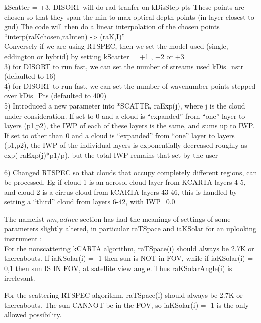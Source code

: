 \documentclass[12pt]{article}
\begin{document}
{{{{       kScatter  = +3, DISORT will do rad tranfer on kDisStep pts 
                       These points are chosen so that they span the min
                       to max optical depth points (in layer closest to gnd)
                   The code will then do a linear interpolation of the
                   chosen points ``interp(raKchosen,raInten) -> (raK,I)''\\

     Conversely if we are using RTSPEC, then we set the model used (single, 
       eddington or hybrid) by setting kScatter  = +1 , +2 or +3 \\

  3) for DISORT to run fast, we can set the number of streams used
       kDis\_nstr  (defaulted to 16)\\

  4) for DISORT to run fast, we can set the number of wavenumber points 
     stepped over kDis\_Pts (defaulted to 400)\\

  5) Introduced a new parameter into *SCATTR, raExp(j), where j is
     the cloud under consideration. If set to 0 and a cloud is 
     ``expanded'' from ``one'' layer to layers (p1,p2), the IWP of each of 
     these layers is the same, and sums up to IWP. 
     If set to other than 0 and a cloud is ``expanded'' from ``one'' layer 
     to layers (p1,p2), the IWP of the individual layers is exponentially 
     decreased roughly as exp(-raExp(j)*p1/p), but the total IWP remains that
     set by the user

   6) Changed RTSPEC so that clouds that occupy completely 
      different regions, can be processed. Eg if cloud 1 is an
      aerosol cloud layer from KCARTA layers 4-5, and cloud 2 is a 
      cirrus cloud from kCARTA layers 43-46, this is handled by 
      setting a ``third'' cloud from layers 6-42, with IWP=0.0

The namelist $nm_radnce$ section has had the meanings of settings of some
parameters slightly altered, in particular raTSpace and iaKSolar for an
uplooking instrument : \\
For the nonscattering kCARTA algorithm, raTSpace(i) should always be 2.7K or 
thereabouts. If iaKSolar(i) = -1 then sun is NOT in FOV, while if iaKSolar(i) 
= 0,1 then sun IS IN FOV, at satellite view angle. Thus raKSolarAngle(i) is 
irrelevant.

For the scattering RTSPEC algorithm, raTSpace(i) should always be 2.7K or 
thereabouts. The sun CANNOT be in the FOV, so iaKSolar(i) = -1 is the only
allowed possibility. 

}}}}
\end{document}
